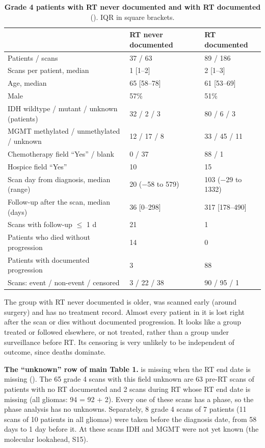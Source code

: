 \documentclass[11pt,a4paper]{article}
\begin{document}
\begin{table}[H]
\centering
\small
\renewcommand{\thetable}{S29}\renewcommand{\theHtable}{S29}
\caption{\textbf{Grade 4 patients with RT never documented and with RT documented}
(). IQR in square brackets.}
\label{tab:S29}
\begin{tabularx}{\linewidth}{@{}L R{3.6cm} R{3.6cm}@{}}
\toprule
 & RT never documented & RT documented \\
\midrule
Patients / scans & 37 / 63 & 89 / 186 \\
Scans per patient, median & 1 [1--2] & 2 [1--3] \\
Age, median & 65 [58--78] & 61 [53--69] \\
Male & 57\% & 51\% \\
IDH wildtype / mutant / unknown (patients) & 32 / 2 / 3 & 80 / 6 / 3 \\
MGMT methylated / unmethylated / unknown & 12 / 17 / 8 & 33 / 45 / 11 \\
Chemotherapy field ``Yes'' / blank & 0 / 37 & 88 / 1 \\
Hospice field ``Yes'' & 10 & 15 \\
Scan day from diagnosis, median (range) & 20 ($-$58 to 579) & 103 ($-$29 to 1332) \\
Follow-up after the scan, median (days) & 36 [0--298] & 317 [178--490] \\
Scans with follow-up $\leq$ 1 d & 21 & 1 \\
Patients who died without progression & 14 & 0 \\
Patients with documented progression & 3 & 88 \\
Scans: event / non-event / censored & 3 / 22 / 38 & 90 / 95 / 1 \\
\bottomrule
\end{tabularx}
\end{table}

The group with RT never documented is older, was scanned early (around surgery) and has no treatment record. Almost
every patient in it is lost right after the scan or dies without documented progression. It looks like a group
treated or followed elsewhere, or not treated, rather than a group under surveillance before RT. Its censoring is very
unlikely to be independent of outcome, since deaths dominate.

\textbf{The ``unknown'' row of main Table 1.}  is missing when the RT end date is missing
(). The 65 grade 4 scans with this field unknown are 63 pre-RT scans of patients with no RT
documented and 2 scans during RT whose RT end date is missing (all gliomas: 94 = 92 + 2). Every one of these scans has
a phase, so the phase analysis has no unknowns. Separately, 8 grade 4 scans of 7 patients (11 scans of 10 patients in
all gliomas) were taken before the diagnosis date, from 58 days to 1 day before it. At these scans IDH and MGMT were
not yet known (the molecular lookahead, S15).
\end{document}
